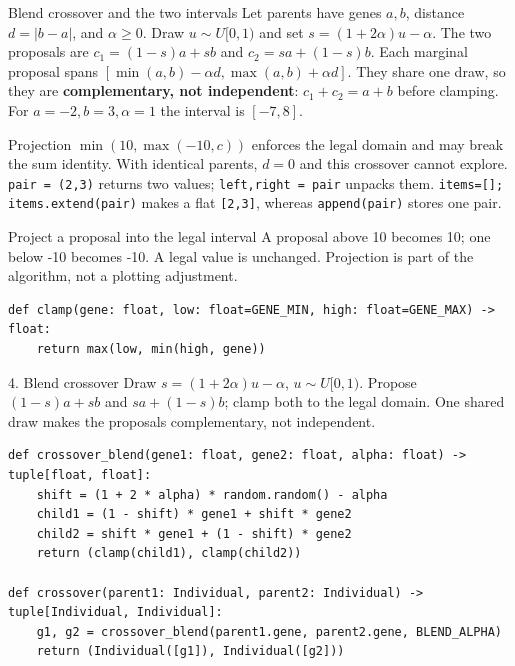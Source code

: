 \begin{frame}[fragile]{Blend crossover and the two intervals}
Let parents have genes $a,b$, distance $d=|b-a|$, and $\alpha\ge0$.
Draw $u\sim U[0,1)$ and set $s=(1+2\alpha)u-\alpha$.
The two proposals are $c_1=(1-s)a+sb$ and $c_2=sa+(1-s)b$.
Each marginal proposal spans $[\min(a,b)-\alpha d,\max(a,b)+\alpha d]$.
They share one draw, so they are \textbf{complementary, not independent}:
$c_1+c_2=a+b$ before clamping. For $a=-2,b=3,\alpha=1$ the interval is $[-7,8]$.

Projection $\min(10,\max(-10,c))$ enforces the legal domain and may break the
sum identity. With identical parents, $d=0$ and this crossover cannot explore.
\texttt{pair = (2,3)} returns two values; \texttt{left,right = pair} unpacks them.
\texttt{items=[]; items.extend(pair)} makes a flat \texttt{[2,3]}, whereas \texttt{append(pair)} stores one pair.
\end{frame}

\begin{frame}[fragile]{Project a proposal into the legal interval}
A proposal above 10 becomes 10; one below -10 becomes -10. A legal value is unchanged. Projection is part of the algorithm, not a plotting adjustment.

\begin{lstlisting}
def clamp(gene: float, low: float=GENE_MIN, high: float=GENE_MAX) -> float:
    return max(low, min(high, gene))
\end{lstlisting}
\end{frame}

\begin{frame}[fragile]{4. Blend crossover}
Draw $s=(1+2\alpha)u-\alpha$, $u\sim U[0,1)$. Propose $(1-s)a+sb$ and $sa+(1-s)b$; clamp both to the legal domain. One shared draw makes the proposals complementary, not independent.

\begin{lstlisting}
def crossover_blend(gene1: float, gene2: float, alpha: float) -> tuple[float, float]:
    shift = (1 + 2 * alpha) * random.random() - alpha
    child1 = (1 - shift) * gene1 + shift * gene2
    child2 = shift * gene1 + (1 - shift) * gene2
    return (clamp(child1), clamp(child2))

def crossover(parent1: Individual, parent2: Individual) -> tuple[Individual, Individual]:
    g1, g2 = crossover_blend(parent1.gene, parent2.gene, BLEND_ALPHA)
    return (Individual([g1]), Individual([g2]))
\end{lstlisting}
\end{frame}

